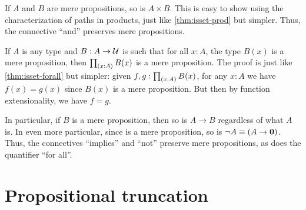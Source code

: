 \documentclass[hott-all.tex]{subfiles}
\begin{document}
\begin{eg}
  If $A$ and $B$ are mere propositions, so is $A\times B$.
  This is easy to show using the characterization of paths in products, just like \cref{thm:isset-prod} but simpler.
  Thus, the connective ``and'' preserves mere propositions.
\end{eg}

\begin{eg}\label{thm:isprop-forall}
  If $A$ is any type and $B:A\to \mathcal{U}$ is such that for all $x:A$, the type $B(x)$ is a mere proposition, then $\prd{x:A} B(x)$ is a mere proposition.
  The proof is just like \cref{thm:isset-forall} but simpler: given $f,g:\prd{x:A} B(x)$, for any $x:A$ we have $f(x)=g(x)$ since $B(x)$ is a mere proposition.
  But then by function extensionality, we have $f=g$.

  In particular, if $B$ is a mere proposition, then so is $A\to B$ regardless of what $A$ is.
  In even more particular, since \emptyt is a mere proposition, so is $\neg A \equiv (A\to\mathbf{0})$.
  Thus, the connectives ``implies'' and ``not'' preserve mere propositions, as does the quantifier ``for all''.
\end{eg}
%
%
%

\section{Propositional truncation}
\label{subsec:prop-trunc}
\end{document}
